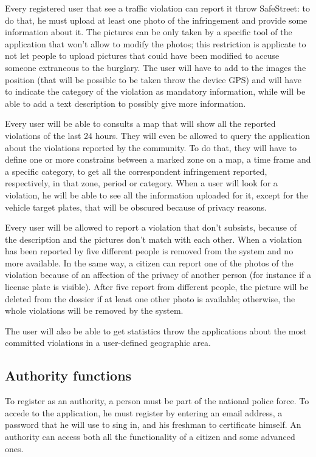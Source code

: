 \documentclass[../RASD.tex]{subfiles}
\begin{document}
    Every registered user that see a traffic violation can report it throw SafeStreet: to do that, he must upload at least one photo of the infringement and provide some information about it. The pictures can be only taken by a specific tool of the application that won't allow to modify the photos; this restriction is applicate to not let people to upload pictures that could have been modified to accuse someone extraneous to the burglary. The user will have to add to the images the position (that will be possible to be taken throw the device GPS) and will have to indicate the category of the violation as mandatory information, while will be able to add a text description to possibly give more information.

    Every user will be able to consults a map that will show all the reported violations of the last 24 hours. They will even be allowed to query the application about the violations reported by the community. To do that, they will have to define one or more constrains between a marked zone on a map, a time frame and a specific category, to get all the correspondent infringement reported, respectively, in that zone, period or category. When a user will look for a violation, he will be able to see all the information uploaded for it, except for the vehicle target plates, that will be obscured because of privacy reasons.

    Every user will be allowed to report a violation that don’t subsists, because of the description and the pictures don’t match with each other. When a violation has been reported by five different people is removed from the system and no more available. In the same way, a citizen can report one of the photos of the violation because of an affection of the privacy of another person (for instance if a license plate is visible). After five report from different people, the picture will be deleted from the dossier if at least one other photo is available; otherwise, the whole violations will be removed by the system.

    The user will also be able to get statistics throw the applications about the most committed violations in a user-defined geographic area.
    \subsection{Authority functions}\label{subsec:authority-functions}
    To register as an authority, a person must be part of the national police force. To accede to the application, he must register by entering an email address, a password that he will use to sing in, and his freshman to certificate himself. An authority can access both all the functionality of a citizen and some advanced ones.
\end{document}

